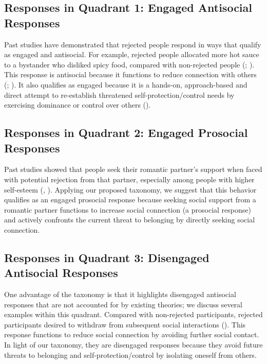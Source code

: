\documentclass[
]{udthesis}
\begin{document}
\subsection{Responses in Quadrant 1: Engaged Antisocial Responses}\label{responses-in-quadrant-1-engaged-antisocial-responses}

Past studies have demonstrated that rejected people respond in ways that
qualify as engaged and antisocial. For example, rejected people
allocated more hot sauce to a bystander who disliked spicy food,
compared with non-rejected people
(; ). This response is antisocial because it
functions to reduce connection with others
(; ). It also qualifies as engaged
because it is a hands-on, approach-based and direct attempt to
re-establish threatened self-protection/control needs by exercising
dominance or control over others ().

\subsection{Responses in Quadrant 2: Engaged Prosocial Responses}\label{responses-in-quadrant-2-engaged-prosocial-responses}

Past studies showed that people seek their romantic partner's support
when faced with potential rejection from that partner, especially among
people with higher self-esteem
(, ). Applying our proposed taxonomy, we
suggest that this behavior qualifies as an engaged prosocial response
because seeking social support from a romantic partner functions to
increase social connection (a prosocial response) and actively confronts
the current threat to belonging by directly seeking social connection.

\subsection{Responses in Quadrant 3: Disengaged Antisocial Responses}\label{responses-in-quadrant-3-disengaged-antisocial-responses}

One advantage of the taxonomy is that it highlights disengaged
antisocial responses that are not accounted for by existing theories; we
discuss several examples within this quadrant. Compared with
non-rejected participants, rejected participants desired to withdraw
from subsequent social interactions ().
This response functions to reduce social connection by avoiding further
social contact. In light of our taxonomy, they are disengaged responses
because they avoid future threats to belonging and
self-protection/control by isolating oneself from others.
\end{document}
